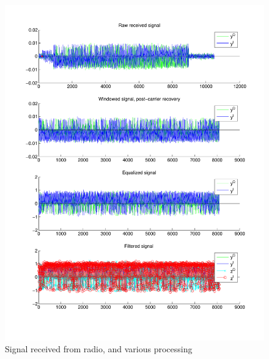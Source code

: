 \documentclass[11pt]{scrartcl}
\begin{document}
\begin{figure}
    \centering
    \includegraphics[width=1.0\textwidth]{figures/receivedsignal.pdf}
    \caption{Signal received from radio, and various processing}
\end{figure}
\end{document}
